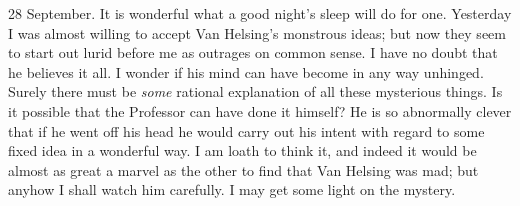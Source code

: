 \begin{diary}{28 September.}
It is wonderful what a good night's sleep will do for one. Yesterday I was almost willing to accept Van Helsing's monstrous ideas; but now they seem to start out lurid before me as outrages on common sense. I have no doubt that he believes it all. I wonder if his mind can have become in any way unhinged. Surely there must be \textit{some} rational explanation of all these mysterious things. Is it possible that the Professor can have done it himself? He is so abnormally clever that if he went off his head he would carry out his intent with regard to some fixed idea in a wonderful way. I am loath to think it, and indeed it would be almost as great a marvel as the other to find that Van Helsing was mad; but anyhow I shall watch him carefully. I may get some light on the mystery.
\end{diary}
 

